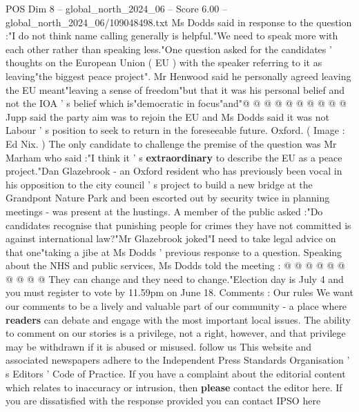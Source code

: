 \begin{textsample}{POS Dim 8 – global\_north\_2024\_06 – Score 6.00 – global\_north\_2024\_06/109048498.txt}
Ms Dodds said in response to the question :"I do not think name calling generally is helpful."We need to speak more with each other rather than speaking less."One question asked for the candidates ' thoughts on the European Union ( EU ) with the speaker referring to it as leaving"the biggest peace project".
Mr Henwood said he personally agreed leaving the EU meant"leaving a sense of freedom"but that it was his personal belief and not the IOA ' s belief which is"democratic in focus"and"@ @ @ @ @ @ @ @ @ @ Jupp said the party aim was to rejoin the EU and Ms Dodds said it was not Labour ' s position to seek to return in the foreseeable future.
Oxford. ( Image : Ed Nix. ) The only candidate to challenge the premise of the question was Mr Marham who said :"I think it ' s \textbf{extraordinary} to describe the EU as a peace project."Dan Glazebrook - an Oxford resident who has previously been vocal in his opposition to the city council ' s project to build a new bridge at the Grandpont Nature Park and been escorted out by security twice in planning meetings - was present at the hustings.
A member of the public asked :"Do candidates recognise that punishing people for crimes they have not committed is against international law?"Mr Glazebrook joked"I need to take legal advice on that one"taking a jibe at Ms Dodds ' previous response to a question.
Speaking about the NHS and public services, Ms Dodds told the meeting : @ @ @ @ @ @ @ @ @ @ They can change and they need to change."Election day is July 4 and you must register to vote by 11.59pm on June 18.
Comments : Our rules We want our comments to be a lively and valuable part of our community - a place where \textbf{readers} can debate and engage with the most important local issues.
The ability to comment on our stories is a privilege, not a right, however, and that privilege may be withdrawn if it is abused or misused. follow us This website and associated newspapers adhere to the Independent Press Standards Organisation ' s Editors ' Code of Practice.
If you have a complaint about the editorial content which relates to inaccuracy or intrusion, then \textbf{please} contact the editor here.
If you are dissatisfied with the response provided you can contact IPSO here

\end{textsample}
